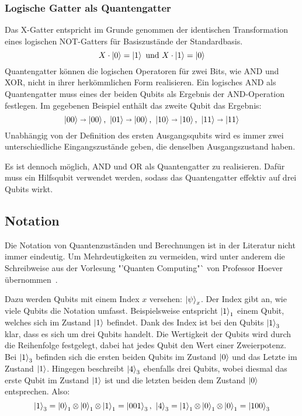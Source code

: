 \subsubsection*{Logische Gatter als Quantengatter} 
Das X-Gatter entspricht im Grunde genommen der identischen Transformation eines logischen NOT-Gatters für Basiszustände der Standardbasis.
\[
  X \cdot \ket{0} = \ket{1} 
  \text{ und }
  X \cdot \ket{1} = \ket{0}
\]
Quantengatter können die logischen Operatoren für zwei Bits, wie AND und XOR, 
nicht in ihrer herkömmlichen Form realisieren. 
Ein logisches AND als Quantengatter muss eines der beiden Qubits als Ergebnis der AND-Operation festlegen.
Im gegebenen Beispiel enthält das zweite Qubit das Ergebnis:
\[
  \ket{00} \shortrightarrow \ket{00} 
  \text{, } 
  \ket{01} \shortrightarrow \ket{00}
  \text{, }
  \ket{10} \shortrightarrow \ket{10}
  \text{, }
  \ket{11} \shortrightarrow \ket{11}
  \]
Unabhängig von der Definition des ersten Ausgangsqubits wird es immer zwei unterschiedliche Eingangszustände geben, 
die denselben Ausgangszustand haben. 

Es ist dennoch möglich, 
AND und OR als Quantengatter zu realisieren. 
Dafür muss ein Hilfsqubit verwendet werden, sodass das Quantengatter effektiv auf drei Qubits wirkt.

\subsection{Notation}
Die Notation von Quantenzuständen und Berechnungen ist in der Literatur nicht immer eindeutig. 
Um Mehrdeutigkeiten zu vermeiden, wird unter anderem die Schreibweise aus der Vorlesung "'Quanten Computing"` 
von Professor Hoever übernommen~\cite{Hoever2023QC}.

Dazu werden Qubits mit einem Index \(x\) versehen: \(\ket{\psi}_x\). 
Der Index gibt an, wie viele Qubits die Notation umfasst. 
Beispielsweise entspricht \(\ket{1}_1\) einem Qubit, 
welches sich im Zustand \(\ket{1}\) befindet.
Dank des Index ist bei den Qubits \(\ket{1}_3\) klar, 
dass es sich um drei Qubits handelt. 
Die Wertigkeit der Qubits wird durch die Reihenfolge festgelegt, 
dabei hat jedes Qubit den Wert einer Zweierpotenz.
Bei \(\ket{1}_3\) befinden sich die ersten beiden Qubits im Zustand \(\ket{0}\) und das Letzte im Zustand \(\ket{1}\).
Hingegen beschreibt \(\ket{4}_3\) ebenfalls drei Qubits, 
wobei diesmal das erste Qubit im Zustand \(\ket{1}\) ist und die letzten beiden dem Zustand \(\ket{0}\) entsprechen.
Also:
\[\ket{1}_3 = \ket{0}_1 \operatorname{\otimes} \ket{0}_1 \operatorname{\otimes} \ket{1}_1 = \ket{001}_3,~
\ket{4}_3 = \ket{1}_1 \operatorname{\otimes} \ket{0}_1 \operatorname{\otimes} \ket{0}_1 = \ket{100}_3\]

